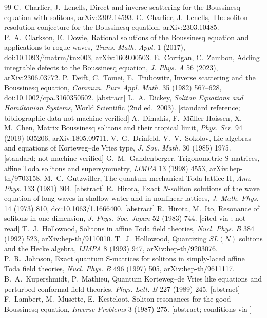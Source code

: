 \documentclass[11pt,a4paper]{article}
\theoremstyle{remark}
\begin{document}
\begin{thebibliography}{99}
 C.~Charlier, J.~Lenells, Direct and inverse scattering for the Boussinesq equation with solitons, arXiv:2302.14593.
 C.~Charlier, J.~Lenells, The soliton resolution conjecture for the Boussinesq equation, arXiv:2303.10485.
 P.~A.~Clarkson, E.~Dowie, Rational solutions of the Boussinesq equation and applications to rogue waves, \emph{Trans. Math. Appl.} 1 (2017), doi:10.1093/imatrm/tnx003, arXiv:1609.00503.
 E.~Corrigan, C.~Zambon, Adding integrable defects to the Boussinesq equation, \emph{J. Phys. A} 56 (2023), arXiv:2306.03772.
 P.~Deift, C.~Tomei, E.~Trubowitz, Inverse scattering and the Boussinesq equation, \emph{Commun. Pure Appl. Math.} 35 (1982) 567--628, doi:10.1002/cpa.3160350502. [abstract]
 L.~A.~Dickey, \emph{Soliton Equations and Hamiltonian Systems}, World Scientific (2nd ed.\ 2003). [standard reference; bibliographic data not machine-verified]
 A.~Dimakis, F.~Müller-Hoissen, X.-M.~Chen, Matrix Boussinesq solitons and their tropical limit, \emph{Phys. Scr.} 94 (2019) 035206, arXiv:1805.09711.
 V.~G.~Drinfeld, V.~V.~Sokolov, Lie algebras and equations of Korteweg--de Vries type, \emph{J. Sov. Math.} 30 (1985) 1975. [standard; not machine-verified]
 G.~M.~Gandenberger, Trigonometric S-matrices, affine Toda solitons and supersymmetry, \emph{IJMPA} 13 (1998) 4553, arXiv:hep-th/9703158.
 M.~C.~Gutzwiller, The quantum mechanical Toda lattice II, \emph{Ann. Phys.} 133 (1981) 304. [abstract]
 R.~Hirota, Exact $N$-soliton solutions of the wave equation of long waves in shallow-water and in nonlinear lattices, \emph{J. Math. Phys.} 14 (1973) 810, doi:10.1063/1.1666400. [abstract]
 R.~Hirota, M.~Ito, Resonance of solitons in one dimension, \emph{J. Phys. Soc. Japan} 52 (1983) 744. [cited via \cite{DMHC}; not read]
 T.~J.~Hollowood, Solitons in affine Toda field theories, \emph{Nucl. Phys. B} 384 (1992) 523, arXiv:hep-th/9110010.
 T.~J.~Hollowood, Quantizing $SL(N)$ solitons and the Hecke algebra, \emph{IJMPA} 8 (1993) 947, arXiv:hep-th/9203076.
 P.~R.~Johnson, Exact quantum S-matrices for solitons in simply-laced affine Toda field theories, \emph{Nucl. Phys. B} 496 (1997) 505, arXiv:hep-th/9611117.
 B.~A.~Kupershmidt, P.~Mathieu, Quantum Korteweg--de Vries like equations and perturbed conformal field theories, \emph{Phys. Lett. B} 227 (1989) 245. [abstract]
 F.~Lambert, M.~Musette, E.~Kesteloot, Soliton resonances for the good Boussinesq equation, \emph{Inverse Problems} 3 (1987) 275. [abstract; conditions via \cite{BD}]

\end{thebibliography}
\end{document}
